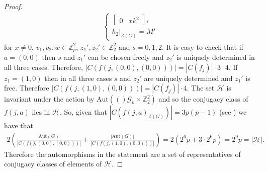 \documentclass[a4paper, english, 9pt]{amsart}
\theoremstyle{plain}
\newtheorem{proposition}[theorem]{Proposition}
\theoremstyle{definition}
\def\ker#1{\mathrm{ker}(#1)}
\def\aut#1{\mathrm{Aut}(#1)}
\def\comment#1{{\color{red} #1}}
\def\setof#1#2{\{#1\,\colon\,#2\}}
\def\Z{\mathbb Z}
\def\LSS{\mathcal{LSS}}
\begin{document}
\begin{proof}
\begin{align*}
\begin{cases}
\begin{bmatrix}
                      0 & xk^2
                  \end{bmatrix},\\
                  h_2|_{Z(G)}=M^s
       \end{cases}
    \end{align*}
    for $x\neq 0$, $v_1,v_2,w\in \Z_p^2$, $z_1',z_2'\in \Z_2^2$ and $s=0,1,2$. It is easy to check that if $a=(0,0)$ then $s$ and $z_1'$ can be chosen freely and $z_2'$ is uniquely determined in all three cases. Therefore, $|C(f(j,(0,0),(0,0)))|=|C(f_j)|\cdot 3\cdot 4$. If $z_1=(1,0)$ then in all three cases $s$ and $z_2'$ are uniquely determined and $z_1'$ is free. Therefore $|C(f(j,(1,0),(0,0)))|=|C(f_j)|\cdot 4$. The set $\mathcal{H}$ is invariant under the action by $\aut(\mathcal{G}_k \times \Z_2^2)$ and so the conjugacy class of $f(j,a)$ lies in $\mathcal{H}$. So, given that $|C(f(j,a)_{Z(G)})|=3p(p-1)$ (see \cite[Lemma 7.8]{LSS}) we have that
    \begin{align*}
    2\left(\frac{|\aut{G}|}{|C(f(j,(0,0),(0,0)))|}+\frac{|\aut{G}|}{|C(f(j,(1,0),(0,0)))|}\right)=2( 2^6p+3\cdot 2^6 p)=2^9p=|\mathcal{H}|.    
    \end{align*}
    Therefore the automorphisms in the statement are a set of representatives of conjugacy classes of elements of $\mathcal{H   }$.
    \end{proof}





%
 

 
\end{document}
